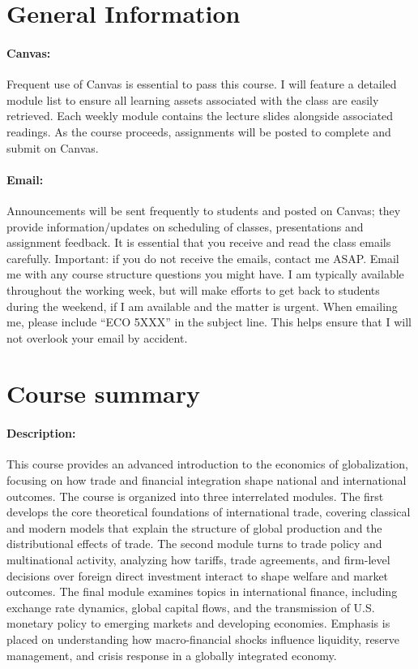 \documentclass[10pt]{article}
\begin{document}
\section*{General Information}

\paragraph{Canvas:} Frequent use of Canvas is essential to pass this course. 
I will feature a detailed module list to ensure all learning assets associated with the class are easily retrieved.   
Each weekly module contains the lecture slides alongside associated readings.
As the course proceeds, assignments will be posted to complete and submit on Canvas. 

\paragraph{Email:} Announcements will be sent frequently to students and posted on Canvas; they provide information/updates on scheduling of classes, presentations and assignment feedback. 
It is essential that you receive and read the class emails carefully.  
Important: if you do not receive the emails, contact me ASAP. 
Email me with any course structure questions you might have.  
I am typically available throughout the working week, but will make efforts to get back to students during the weekend, if I am available and the matter is urgent. 
When emailing me, please include ``ECO 5XXX” in the subject line. 
This helps ensure that I will not overlook your email by accident. 


\newpage



\section*{Course summary}

\paragraph{Description:} This course provides an advanced introduction to the economics of globalization, focusing on how trade and financial integration shape national and international outcomes. 
The course is organized into three interrelated modules. 
The first develops the core theoretical foundations of international trade, covering classical and modern models that explain the structure of global production and the distributional effects of trade. 
The second module turns to trade policy and multinational activity, analyzing how tariffs, trade agreements, and firm-level decisions over foreign direct investment interact to shape welfare and market outcomes. 
The final module examines topics in international finance, including exchange rate dynamics, global capital flows, and the transmission of U.S. monetary policy to emerging markets and developing economies. 
Emphasis is placed on understanding how macro-financial shocks influence liquidity, reserve management, and crisis response in a globally integrated economy. 
\end{document}
